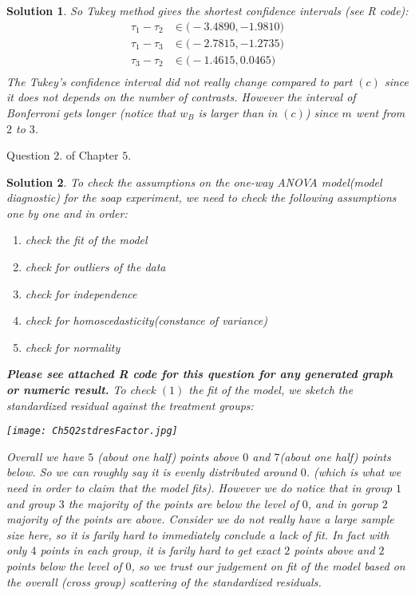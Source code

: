 \documentclass[11pt]{article}
\newtheorem{sol}{Solution}
\begin{document}
\begin{sol}
	So Tukey method gives the shortest confidence intervals (see R code):
	\begin{align*}
		\tau_1 - \tau_2 &\in \Big(-3.4890, -1.9810\Big)\\
		\tau_1 - \tau_3 &\in \Big(-2.7815, -1.2735\Big)\\
		\tau_3 - \tau_2 &\in \Big(-1.4615, 0.0465\Big)\\
	\end{align*}
	The Tukey's confidence interval did not really change compared to part $(c)$ since it does not depends on the number of contrasts.\vskip 2mm
	However the interval of Bonferroni gets longer (notice that $w_B$ is larger than in $(c)$) since $m$ went from $2$ to $3$.
\end{sol}
Question $2.$ of Chapter $5.$
\begin{sol}
	To check the assumptions on the one-way ANOVA model(model diagnostic) for the soap experiment, we need to check the following assumptions one by one and in order:
	\begin{enumerate}
		\item [(1)] check the fit of the model
		\item [(2)] check for outliers of the data
		\item [(3)] check for independence
		\item [(4)] check for homoscedasticity(constance of variance)
		\item [(5)] check for normality
	\end{enumerate}
	{\bf Please see attached R code for this question for any generated graph or numeric result.}\vskip 2mm
	To check $(1)$ the fit of the model, we sketch the standardized residual against the treatment groups:\vskip 2mm
	\begin{center}
		\texttt{[image: Ch5Q2stdresFactor.jpg]}
	\end{center}
	Overall we have $5$ (about one half) points above $0$ and $7$(about one half) points below. So we can roughly say it is evenly distributed around $0$. (which is what we need in order to claim that the model fits). However we do notice that in group $1$ and group $3$ the majority of the points are below the level of $0$, and in gorup $2$ majority of the points are above. Consider we do not really have a large sample size here, so it is farily hard to immediately conclude a lack of fit. In fact with only $4$ points in each group, it is farily hard to get exact $2$ points above and $2$ points below the level of $0$, so we trust our judgement on fit of the model based on the overall (cross group) scattering of the standardized residuals.\vskip 2mm

\end{sol}
\end{document}
